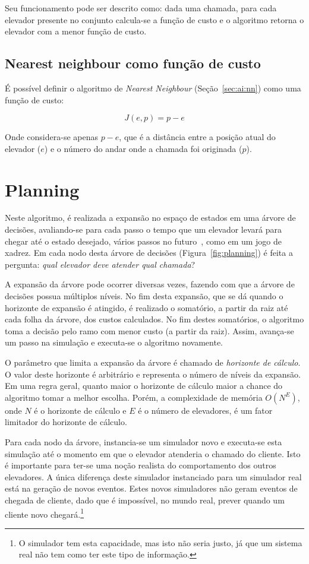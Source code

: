 Seu funcionamento pode ser descrito como: dada uma chamada, para cada elevador
presente no conjunto calcula-se a função de custo e o algoritmo retorna o
elevador com a menor função de custo.

\subsection{Nearest neighbour como função de custo}

É possível definir o algoritmo de \textit{Nearest Neighbour}
(Seção~\ref{sec:ai:nn}) como uma função de custo:

\[J(e, p) = p - e\]

Onde considera-se apenas $p - e$, que é a distância entre a posição atual do
elevador ($e$) e o número do andar onde a chamada foi originada ($p$).

\section{\label{sec:ai:planning}Planning}

Neste algoritmo, é realizada a expansão no espaço de estados em uma árvore de
decisões, avaliando-se para cada passo o tempo que um elevador levará para
chegar até o estado desejado, vários passos no
futuro~\cite{Koehler00elevatorcontrol}, como em um jogo de xadrez. Em cada nodo
desta árvore de decisões (Figura~\ref{fig:planning}) é feita a pergunta:
\textit{qual elevador deve atender qual chamada}?

A expansão da árvore pode ocorrer diversas vezes, fazendo com que a árvore de
decisões possua múltiplos níveis. No fim desta expansão, que se dá quando
o horizonte de expansão é atingido, é realizado o somatório, a partir da raiz até
cada folha da árvore, dos custos calculados. No fim destes somatórios, o
algoritmo toma a decisão pelo ramo com menor custo (a partir da raiz). Assim,
avança-se um passo na simulação e executa-se o algoritmo novamente.

O parâmetro que limita a expansão da árvore é chamado de \textit{horizonte de
cálculo}. O valor deste horizonte é arbitrário e representa o número de níveis
da expansão. Em uma regra geral, quanto maior o horizonte de cálculo maior a
chance do algoritmo tomar a melhor escolha. Porém, a complexidade de memória
$O(N^{E})$, onde $N$ é o horizonte de cálculo e $E$ é o número de elevadores,
é um fator limitador do horizonte de cálculo.

Para cada nodo da árvore, instancia-se um simulador novo e executa-se esta
simulação até o momento em que o elevador atenderia o chamado do cliente. Isto é
importante para ter-se uma noção realista do comportamento dos outros
elevadores. A única diferença deste simulador instanciado para um simulador real
está na geração de novos eventos. Estes novos simuladores não geram eventos de
chegada de cliente, dado que é impossível, no mundo real, prever quando um
cliente novo chegará.\footnote{O simulador tem esta capacidade, mas isto não
  seria justo, já que um sistema real não tem como ter este tipo de informação.}

